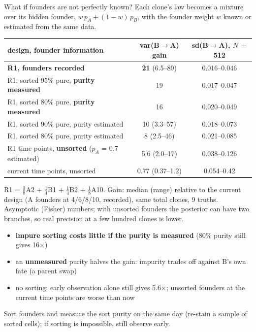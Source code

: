 \documentclass[aspectratio=169,11pt]{beamer}
\newcommand{\BA}{B$\to$A}
\begin{document}
\begin{frame}{What if founders are not perfectly known?}
\vspace{0pt}
\footnotesize Each clone's law becomes a mixture over its hidden founder, $w\,p_A + (1-w)\,p_B$, with the founder weight $w$ known or estimated from the same data.

\smallskip
\centering
{\scriptsize\setlength{\tabcolsep}{4pt}
\begin{tabular}{@{}lcc@{}}\toprule
design, founder information & var(\BA) gain & sd(\BA), $N$ = 512 \\\midrule
\textbf{R1, founders recorded} & \textbf{21} (6.5--89) & 0.016--0.046 \\
R1, sorted 95\% pure, \textbf{purity measured} & 19 & 0.017--0.047 \\
R1, sorted 80\% pure, \textbf{purity measured} & 16 & 0.020--0.049 \\
R1, sorted 90\% pure, purity estimated & 10 (3.3--57) & 0.018--0.073 \\
R1, sorted 80\% pure, purity estimated & 8 (2.5--46) & 0.021--0.085 \\
R1 time points, \textbf{unsorted} ($p_A$ = 0.7 estimated) & 5.6 (2.0--17) & 0.038--0.126 \\
current time points, unsorted & \alert{0.77} (0.37--1.2) & 0.054--0.42 \\\bottomrule
\end{tabular}}

\raggedright
{\tiny R1 = $\tfrac38$A2 + $\tfrac14$B1 + $\tfrac14$B2 + $\tfrac18$A10. Gain: median (range) relative to the current design (A founders at 4/6/8/10, recorded), same total clones, 9 truths. Asymptotic (Fisher) numbers; with unsorted founders the posterior can have two branches, so real precision at a few hundred clones is lower.}

\begin{itemize}\scriptsize
\item \textbf{impure sorting costs little if the purity is measured} (80\% purity still gives 16$\times$)
\item an \textbf{unmeasured} purity halves the gain: impurity trades off against B's own fate (a parent swap)
\item no sorting: early observation alone still gives 5.6$\times$; unsorted founders at the current time points are \alert{worse than now}
\end{itemize}
\begin{block}{}\footnotesize Sort founders and measure the sort purity on the same day (re-stain a sample of sorted cells); if sorting is impossible, still observe early.\end{block}
\end{frame}
\end{document}

